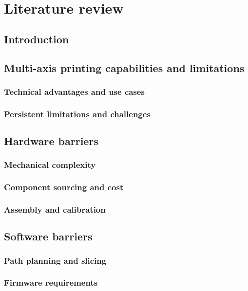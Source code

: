 \chapter{Literature review}
\label{chap:literature}

\section{Introduction}
\label{sec:lit-intro}

\section{Multi-axis printing capabilities and limitations}
\label{sec:lit-multiaxis}

\subsection{Technical advantages and use cases}
\subsection{Persistent limitations and challenges}

\section{Hardware barriers}
\label{sec:lit-hardware}

\subsection{Mechanical complexity}
\subsection{Component sourcing and cost}
\subsection{Assembly and calibration}

\section{Software barriers}
\label{sec:lit-software}

\subsection{Path planning and slicing}
\subsection{Firmware requirements}

